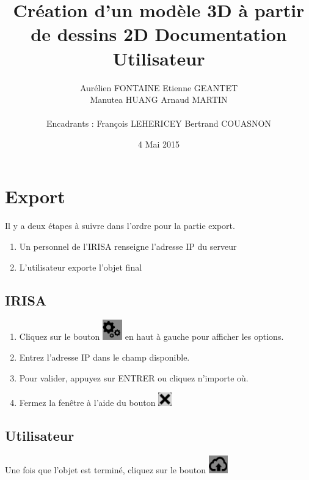 \documentclass[a4paper,11pt]{article}
\title{ \textbf{Création d'un modèle 3D à partir de dessins 2D Documentation Utilisateur} }
\author{ Aurélien \textsc{FONTAINE} Etienne \textsc{GEANTET} \\
	Manutea \textsc{HUANG} Arnaud \textsc{MARTIN} \\
	\\
	Encadrants : François \textsc{LEHERICEY}	Bertrand \textsc{COUASNON}}
\date{4 Mai 2015}                    %
\begin{document}
\maketitle                 %
\thispagestyle{empty}      %

\tableofcontents




\section{Export}
	Il y a deux étapes à suivre dans l'ordre pour la partie export.
	\begin{enumerate}
		\item Un personnel de l'IRISA renseigne l'adresse IP du serveur
		\item L'utilisateur exporte l'objet final
	\end{enumerate}
	\subsection{IRISA}
		\begin{enumerate}
		\item Cliquez sur le bouton \includegraphics[scale=0.7]{./images/engrenage.png} en haut à gauche pour afficher les options.
		
		\item Entrez l'adresse IP dans le champ disponible.
		
		\item Pour valider, appuyez sur ENTRER ou cliquez n'importe où.
		
		\item Fermez la fenêtre à l'aide du bouton \includegraphics{./images/closewindow.png}
		\end{enumerate}
	\subsection{Utilisateur}
			Une fois que l'objet est terminé, cliquez sur le bouton \includegraphics[scale=0.8]{./images/export.png}
		
\end{document}

